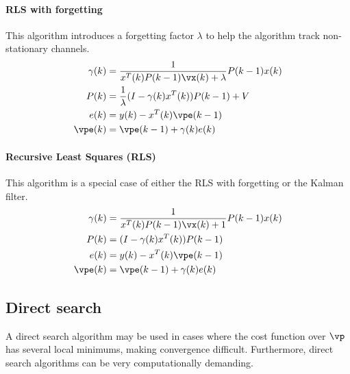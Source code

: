 \paragraph{RLS with forgetting}
This algorithm introduces a forgetting factor $\lambda$
to help the algorithm track non-stationary channels.
\begin{align*}
   \gamma(k) &= \frac{1}{x^T(k)P(k-1)\vx(k)+\lambda}  P(k-1)x(k) \\
   P(k) &= \frac{1}{\lambda}(I-\gamma(k)x^T(k))P(k-1)+V \\
   e(k) &= y(k) - x^T(k)\vpe(k-1) \\
   \vpe(k) &= \vpe(k-1) + \gamma(k)e(k)
\end{align*}
\fi

\paragraph{Recursive Least Squares (RLS)}
This algorithm is a special case of either the RLS with forgetting
or the Kalman filter.
\begin{align*}
   \gamma(k) &= \frac{1}{x^T(k)P(k-1)\vx(k)+1}  P(k-1)x(k) \\
   P(k) &= (I-\gamma(k)x^T(k))P(k-1) \\
   e(k) &= y(k) - x^T(k)\vpe(k-1) \\
   \vpe(k) &= \vpe(k-1) + \gamma(k)e(k)
\end{align*}




\subsection{Direct search}
A direct search algorithm may be used in cases where the cost
function over $\vp$ has several local minimums, making convergence difficult.
Furthermore, direct search algorithms can be very computationally demanding.

